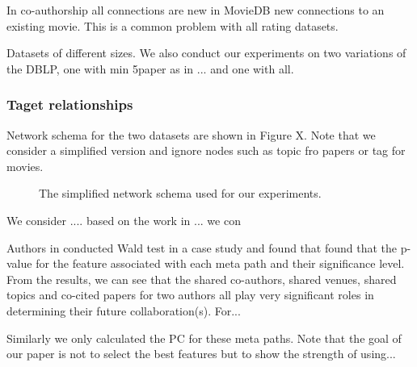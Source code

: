 In co-authorship all connections are new in MovieDB new connections to an existing movie. This is a common problem with all rating datasets.



Datasets of different sizes.
We also conduct our experiments on two variations of the DBLP, one with min 5paper as in ... and one with all.


\subsubsection{Taget relationships}\label{targetRelashipSection}

Network schema for the two datasets are shown in Figure X. Note that we consider a simplified version and ignore nodes such as topic fro papers or tag for movies.


\begin{figure}[t]
\centering
{}
\caption{The simplified network schema used for our experiments.} \label{Fig:expSchema}
\end{figure}


We consider .... based on the work in ... we con

Authors in \cite{sun2011ASONAM} conducted Wald test in a case study and found that found that the p-value for the feature associated with each meta path and their significance level. From the results, we can see that the shared co-authors, shared venues, shared topics and co-cited papers for two authors all play very significant roles in determining their future collaboration(s). For...

Similarly we only calculated the PC for these meta paths. Note that the goal of our paper is not to select the best features but to show the strength of using...

